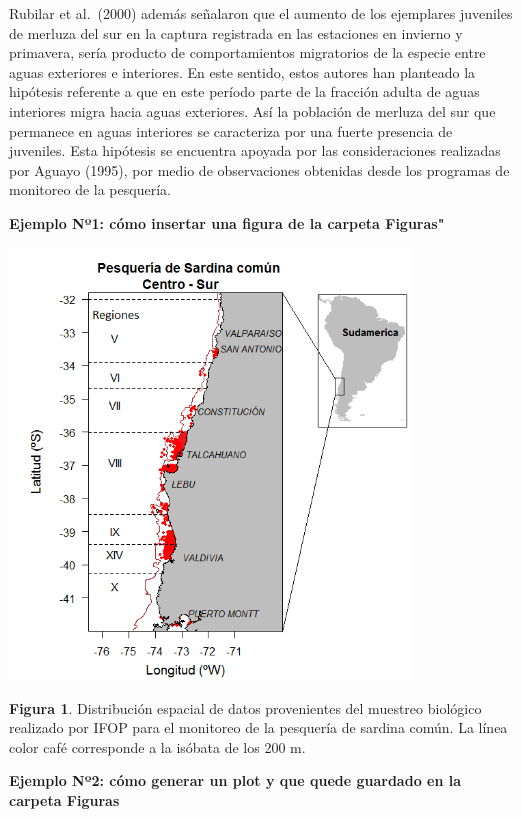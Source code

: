 \documentclass[
  spanish,
]{article}
\begin{document}
Rubilar et al.~(2000) además señalaron que el aumento de los ejemplares
juveniles de merluza del sur en la captura registrada en las estaciones
en invierno y primavera, sería producto de comportamientos migratorios
de la especie entre aguas exteriores e interiores. En este sentido,
estos autores han planteado la hipótesis referente a que en este período
parte de la fracción adulta de aguas interiores migra hacia aguas
exteriores. Así la población de merluza del sur que permanece en aguas
interiores se caracteriza por una fuerte presencia de juveniles. Esta
hipótesis se encuentra apoyada por las consideraciones realizadas por
Aguayo (1995), por medio de observaciones obtenidas desde los programas
de monitoreo de la pesquería.

\textbf{Ejemplo Nº1: cómo insertar una figura de la carpeta Figuras"}

\begin{center}
\includegraphics[width=0.8\textwidth]{Figuras/Figura1.png}
\end{center}

\small \textbf{Figura 1}. Distribución espacial de datos provenientes
del muestreo biológico realizado por IFOP para el monitoreo de la
pesquería de sardina común. La línea color café corresponde a la isóbata
de los 200 m. \vspace{0.5cm} \normalsize

\textbf{Ejemplo Nº2: cómo generar un plot y que quede guardado en la
carpeta Figuras}
\end{document}

